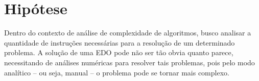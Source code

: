 \section{Hipótese}\label{lhipotese}

Dentro do contexto de análise de complexidade de algoritmos, busco 
analisar a quantidade de instruções necessárias para a resolução de um 
determinado problema. A solução de uma EDO
pode não ser tão obvia quanto parece, necessitando de 
análises numéricas para resolver tais problemas, pois pelo modo 
analítico -- ou seja, manual -- o problema pode se tornar mais complexo.
